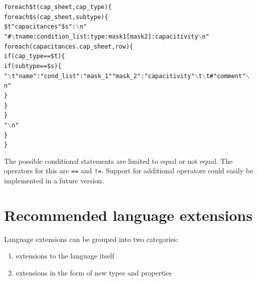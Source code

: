 \begin{alltt}
foreach \$t (cap_sheet, cap_type) \{
   foreach \$s (cap_sheet, subtype) \{
        \$t " capacitances " \$s ":\(\backslash\)n"
        "#\(\backslash\)tname:condition_list:type:mask1 [mask2]:capacitivity\(\backslash\)n"
        foreach(capacitances.cap_sheet, row) \{
           if (cap_type == \$t) \{
               if (subtype == \$s) \{
                   "\(\backslash\)t" name ":" cond_list ":" mask_1 " " mask_2 ":" capacitivity "\(\backslash\)t\(\backslash\)t# " comment "\(\backslash\)n"
               \}
           \}
        \}
        "\(\backslash\)n"
   \}
\}
\end{alltt}


\bigskip \noindent
The possible conditional statements are limited to equal or not equal. The
operators for this are \verb|==| and \verb|!=|. Support for additional
operators could easily be implemented in a future version.

\section{Recommended language extensions} \label{sect:language:extensions}
Language extensions can be grouped into two categories:
\begin{enumerate}
\item extensions to the language itself
\item extensions in the form of new types and properties
\end{enumerate}

